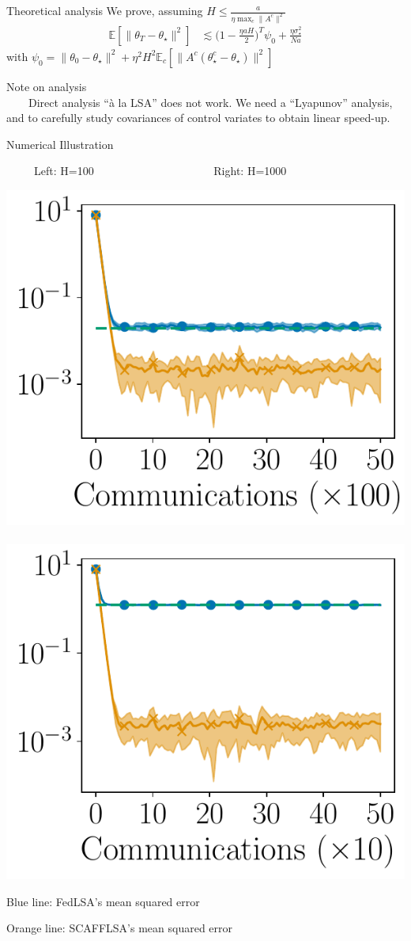 \documentclass[aspectratio=169,14pt]{beamer}
\begin{document}
\begin{frame}{Theoretical analysis}
  We prove, assuming $H \le \frac{a}{\eta \max_c \| A^c \|^2}$
  \begin{align*}
    \mathbb{E}[\| \theta_{T} - \theta_\star \|^2]
    & \lesssim{}
      \big( 
      1 - \tfrac{\eta a H}{2}
      \big)^T \psi_0
      +
      \frac{\eta \sigma_\star^2}{N a}
  \end{align*}
  with $\psi_0 = \| \theta_0 - \theta_\star \|^2 + \eta^2H^2 \mathbb{E}_c[\| A^c( \theta_\star^c - \theta_\star) \|^2]$


  \vspace{1em}

  \pause
  
  \small

  Note on analysis\\  
  ~~~~Direct analysis ``à la LSA'' does not work. We need a ``Lyapunov'' analysis, and to carefully study covariances of control variates to obtain linear speed-up.
\end{frame}

\begin{frame}{Numerical Illustration}
  \vspace{-0.5em}
  
  \begin{center}
    ~~~~~Left: H=100~~~~~~~~~~~~~~~~~~~~~
    Right: H=1000
 
    \vspace{-1em}
   
    \includegraphics[width=0.4\linewidth]{images/plot_hg_100_n100.pdf}
    ~~
    \includegraphics[width=0.4\linewidth]{images/plot_hg_1000_n100.pdf}
  \end{center}

  \vspace{-1em}

  Blue line: FedLSA's mean squared error

  \vspace{-1em}

  Orange line: SCAFFLSA's mean squared error
\end{frame}
\end{document}
